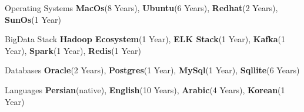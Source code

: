 \begin{cvskills}
  \cvskill
    {Operating Systems} %
    {\textbf{MacOs}(8 Years), \textbf{Ubuntu}(6 Years), \textbf{Redhat}(2 Years), \textbf{SunOs}(1 Year)} %
    
  \cvskill
    {BigData Stack} %
    {\textbf{Hadoop Ecosystem}(1 Year), \textbf{ELK Stack}(1 Year), \textbf{Kafka}(1 Year), \textbf{Spark}(1 Year), \textbf{Redis}(1 Year)} %


  \cvskill
    {Databases} %
    {\textbf{Oracle}(2 Years), \textbf{Postgres}(1 Year), \textbf{MySql}(1 Year), \textbf{Sqllite}(6 Years)} %

  \cvskill
    {Languages} %
    {\textbf{Persian}(native), \textbf{English}(10 Years),  \textbf{Arabic}(4 Years), \textbf{Korean}(1 Year)} %
\end{cvskills}
